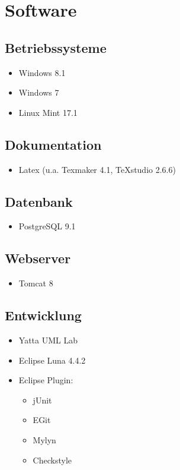 \documentclass[a4paper]{scrreprt}
\begin{document}
    \section{Software}
        \subsection{Betriebssysteme}
            \begin{itemize}
            	\item Windows 8.1
            	\item Windows 7
            	\item Linux Mint 17.1
            \end{itemize}	
            
        \subsection{Dokumentation}
            \begin{itemize}
            	\item Latex (u.a. Texmaker 4.1, TeXstudio 2.6.6)
            \end{itemize}
            
        \subsection{Datenbank}
           \begin{itemize}
           	\item PostgreSQL 9.1
           \end{itemize}
           
        \subsection{Webserver}
            \begin{itemize}
            	\item Tomcat 8
            \end{itemize}
            
        \subsection{Entwicklung}
           \begin{itemize}
           	\item Yatta UML Lab
           	\item Eclipse Luna 4.4.2
           	\item Eclipse Plugin: \\
	           	\begin{itemize}
	           		\item jUnit
	           		\item EGit
	           		\item Mylyn
	           		\item Checkstyle  
	           	\end{itemize} 
           \end{itemize}
           
\end{document}
